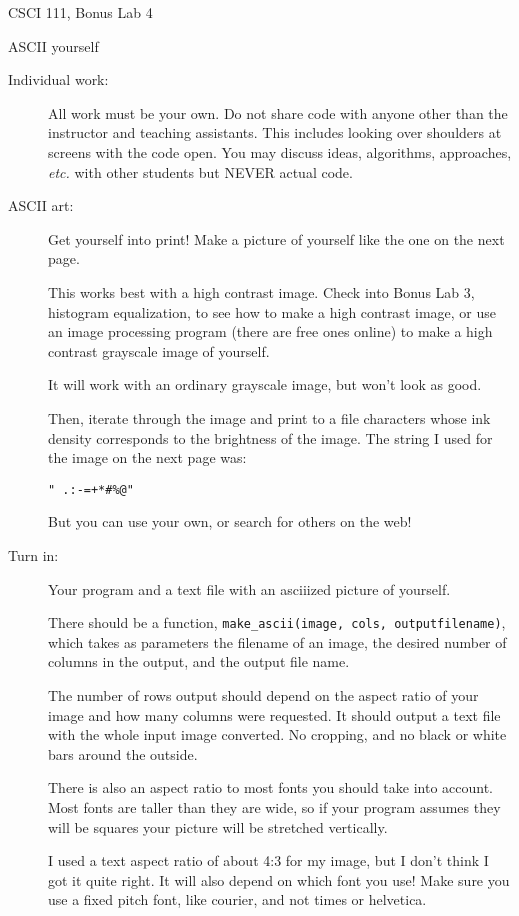 \documentclass[12pt]{article}
\begin{document}
\sloppy
\centerline{\Large CSCI 111, Bonus Lab 4}
\centerline{\large ASCII yourself}


\begin{description}


\item[Individual work:]  All work must be your own.  Do not share
code with anyone other than the instructor and teaching assistants.
This includes looking over shoulders at screens with the code open.
You may discuss ideas, algorithms, approaches, {\em etc.} with
other students but NEVER actual code.

\item[ASCII art:]
Get yourself into print!  Make a picture of yourself
like the one on the next page.

This works best with
a high contrast image.  Check into Bonus Lab 3, histogram
equalization, to see how to make a high contrast image,
or use an image processing program
(there are free ones online)
to make a high contrast grayscale image of yourself.

It will work with an ordinary grayscale image,
but won't look as good.

Then, iterate through the image and 
print to a file characters whose ink density
corresponds to the brightness of the image.
The string I used for the image on the next page
was:
\begin{lstlisting}
" .:-=+*#%@"
\end{lstlisting}
But you can use your own, or search for others on the web!

\item[Turn in:] Your program and a text file with 
an asciiized picture of yourself.  

There should be a
function, \lstinline{make_ascii(image, cols, outputfilename)}, 
which takes as parameters
the filename of an image, the desired number of columns
in the output, and the output file name.

The number of rows output should depend on the aspect
ratio of your image and how many columns were requested.
It should output a text file with the whole input image
converted.  No cropping, and no black or white bars around
the outside.

There is also an aspect ratio to most fonts you should 
take into account.  Most fonts are taller than they are
wide, so if your program assumes they will be squares your
picture will be stretched vertically.

I used a text aspect ratio of 
about 4:3 for my image, but I don't think I got it
quite right.  It will also depend on which font you use!
Make sure you use a fixed pitch font, like courier, and
not times or helvetica.

\end{description}
\end{document}
